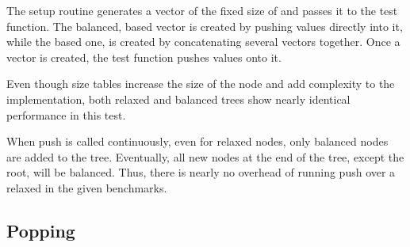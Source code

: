 The setup routine generates a vector of the fixed size of \n{} and passes it to the test function. The balanced, \rbtree{} based vector is created by pushing values directly into it, while the \rrbtree{} based one, is created by concatenating several vectors together. Once a vector is created, the test function pushes \n{} values onto it.

Even though size tables increase the size of the node and add complexity to the implementation, both relaxed and balanced trees show nearly identical performance in this test.

When push is called continuously, even for relaxed nodes, only balanced nodes are added to the tree. Eventually, all new nodes at the end of the tree, except the root, will be balanced. Thus, there is nearly no overhead of running push over a relaxed \rrbvec{} in the given benchmarks.

\subsection{Popping}

